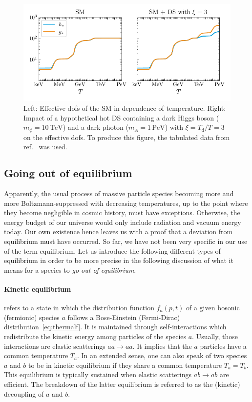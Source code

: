\begin{figure}[t]
	\centering
	\includegraphics[width=\linewidth]{thesisplots/geff/geffs}
	\caption{Left: Effective \acp{dof} of the \ac{SM} in dependence of temperature. Right: Impact of a hypothetical hot \ac{DS} containing a dark Higgs boson ($m_\phi = 10 \, \text{TeV}$) and a dark photon ($m_A = 1 \, \text{PeV}$) with $\xi = T_\text{d} / T = 3$ on the effective \acp{dof}. To produce this figure, the tabulated data from ref.~\cite{Husdal:2016haj} was used.}
	\label{fig:geffs}
\end{figure}



\subsection{Going out of equilibrium}

Apparently, the usual process of massive particle species becoming more and more Boltzmann-suppressed with decreasing temperatures, up to the point where they become negligible in cosmic history,  must have exceptions. Otherwise, the energy budget of our universe would only include radiation and vacuum energy today.  Our own existence hence leaves us with a proof that a deviation from equilibrium must have occurred. So far, we have not been very specific in our use of the term equilibrium. Let us introduce the following different types of equilibrium in order to be more precise in the following discussion of what it means for a species to \textit{go out of equilibrium}.

\paragraph{Kinetic equilibrium} refers to a state in which the distribution function $f_a(p,t)$ of a given bosonic (fermionic) species $a$ follows a Bose-Einstein (Fermi-Dirac) distribution~\eqref{eq:thermalf}. It is maintained through self-interactions which redistribute the kinetic energy among particles of the species $a$. Usually, those interactions are elastic scatterings $a a \rightarrow a a$. It implies  that the $a$ particles have a common temperature $T_a$. In an extended sense, one can also speak of two species $a$ and $b$ to be in kinetic equilibrium if they share a common temperature $T_a = T_b$. This equilibrium is typically sustained when elastic scatterings $a b \rightarrow a b$ are efficient. The breakdown of the latter equilibrium is referred to as the (kinetic) decoupling of $a$ and $b$.

